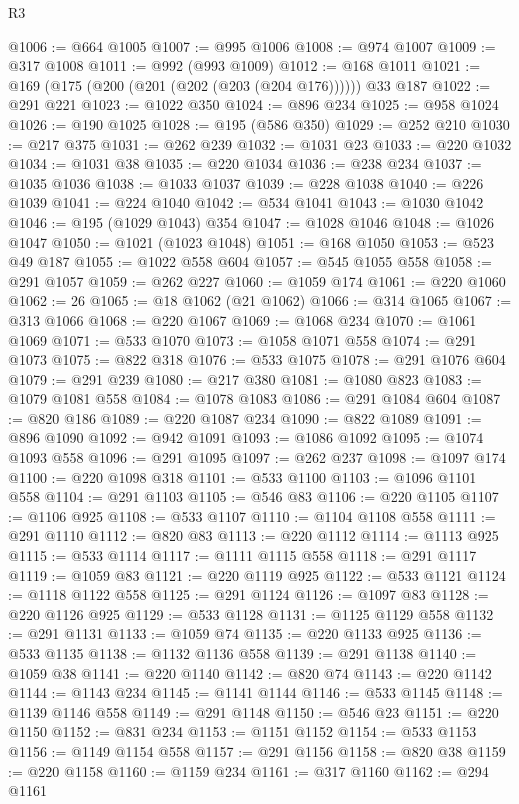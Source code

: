 \begin{lexlean}{R3}
\begin{coremodule}
@1006 := @664 @1005
@1007 := @995 @1006
@1008 := @974 @1007
@1009 := @317 @1008
@1011 := @992 (@993 @1009)
@1012 := @168 @1011
@1021 := @169 (@175 (@200 (@201 (@202 (@203 (@204 @176)))))) @33 @187
@1022 := @291 @221
@1023 := @1022 @350
@1024 := @896 @234
@1025 := @958 @1024
@1026 := @190 @1025
@1028 := @195 (@586 @350)
@1029 := @252 @210
@1030 := @217 @375
@1031 := @262 @239
@1032 := @1031 @23
@1033 := @220 @1032
@1034 := @1031 @38
@1035 := @220 @1034
@1036 := @238 @234
@1037 := @1035 @1036
@1038 := @1033 @1037
@1039 := @228 @1038
@1040 := @226 @1039
@1041 := @224 @1040
@1042 := @534 @1041
@1043 := @1030 @1042
@1046 := @195 (@1029 @1043) @354
@1047 := @1028 @1046
@1048 := @1026 @1047
@1050 := @1021 (@1023 @1048)
@1051 := @168 @1050
@1053 := @523 @49 @187
@1055 := @1022 @558 @604
@1057 := @545 @1055 @558
@1058 := @291 @1057
@1059 := @262 @227
@1060 := @1059 @174
@1061 := @220 @1060
@1062 := 26
@1065 := @18 @1062 (@21 @1062)
@1066 := @314 @1065
@1067 := @313 @1066
@1068 := @220 @1067
@1069 := @1068 @234
@1070 := @1061 @1069
@1071 := @533 @1070
@1073 := @1058 @1071 @558
@1074 := @291 @1073
@1075 := @822 @318
@1076 := @533 @1075
@1078 := @291 @1076 @604
@1079 := @291 @239
@1080 := @217 @380
@1081 := @1080 @823
@1083 := @1079 @1081 @558
@1084 := @1078 @1083
@1086 := @291 @1084 @604
@1087 := @820 @186
@1089 := @220 @1087 @234
@1090 := @822 @1089
@1091 := @896 @1090
@1092 := @942 @1091
@1093 := @1086 @1092
@1095 := @1074 @1093 @558
@1096 := @291 @1095
@1097 := @262 @237
@1098 := @1097 @174
@1100 := @220 @1098 @318
@1101 := @533 @1100
@1103 := @1096 @1101 @558
@1104 := @291 @1103
@1105 := @546 @83
@1106 := @220 @1105
@1107 := @1106 @925
@1108 := @533 @1107
@1110 := @1104 @1108 @558
@1111 := @291 @1110
@1112 := @820 @83
@1113 := @220 @1112
@1114 := @1113 @925
@1115 := @533 @1114
@1117 := @1111 @1115 @558
@1118 := @291 @1117
@1119 := @1059 @83
@1121 := @220 @1119 @925
@1122 := @533 @1121
@1124 := @1118 @1122 @558
@1125 := @291 @1124
@1126 := @1097 @83
@1128 := @220 @1126 @925
@1129 := @533 @1128
@1131 := @1125 @1129 @558
@1132 := @291 @1131
@1133 := @1059 @74
@1135 := @220 @1133 @925
@1136 := @533 @1135
@1138 := @1132 @1136 @558
@1139 := @291 @1138
@1140 := @1059 @38
@1141 := @220 @1140
@1142 := @820 @74
@1143 := @220 @1142
@1144 := @1143 @234
@1145 := @1141 @1144
@1146 := @533 @1145
@1148 := @1139 @1146 @558
@1149 := @291 @1148
@1150 := @546 @23
@1151 := @220 @1150
@1152 := @831 @234
@1153 := @1151 @1152
@1154 := @533 @1153
@1156 := @1149 @1154 @558
@1157 := @291 @1156
@1158 := @820 @38
@1159 := @220 @1158
@1160 := @1159 @234
@1161 := @317 @1160
@1162 := @294 @1161

\end{coremodule}
\end{lexlean}

